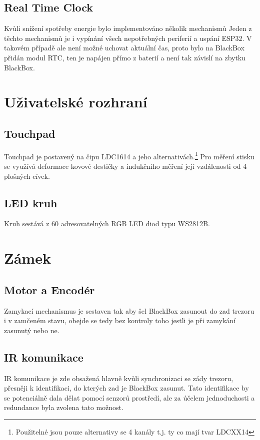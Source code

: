 \subsection{Real Time Clock}
Kvůli snížení spotřeby energie bylo implementováno několik mechanismů
Jeden z těchto mechanismů je i vypínání všech nepotřebných periferií a uspání ESP32. V takovém případě ale není možné uchovat aktuální čas, proto bylo na BlackBox přidán modul RTC, ten je napájen přímo z baterií a není tak závislí na zbytku BlackBox.

\section{Uživatelské rozhraní}

\subsection{Touchpad}
Touchpad je postavený na čipu LDC1614 a jeho alternativách.\footnote{Použitelné jsou pouze alternativy se 4 kanály t.j. ty co mají tvar LDCXX14}
Pro měření stisku se využívá deformace kovové destičky a indukčního měření její vzdálenosti od 4 plošných cívek.

\subsection{LED kruh}
Kruh sestává z 60 adresovatelných RGB LED diod typu WS2812B.

\section{Zámek}

\subsection{Motor a Encodér}
Zamykací mechanismus je sestaven tak aby šel BlackBox zasunout do zad trezoru i v zamčeném stavu, obejde se tedy bez kontroly toho jestli je při zamykání zasunutý nebo ne.

\subsection{IR komunikace}
IR komunikace je zde obsažená hlavně kvůli synchronizaci se zády trezoru, přesněji k identifikaci, do kterých zad je BlackBox zasunut.
Tato identifikace by se potenciálně dala dělat pomocí senzorů prostředí, ale za účelem jednoduchosti a redundance byla zvolena tato možnost.

